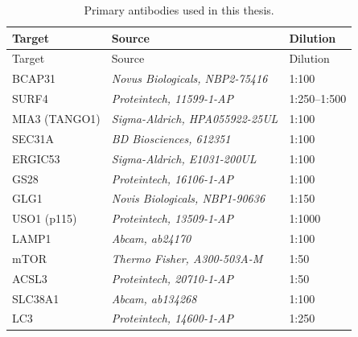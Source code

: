 \documentclass[
  12pt,
  a4paper,
]{book}
\begin{document}
\begin{longtable}[]{@{}lll@{}}
\caption{\label{tab:primary-table}Primary antibodies used in this thesis.}\tabularnewline
\toprule()
Target & Source & Dilution \\
\midrule()
\endfirsthead
\toprule()
Target & Source & Dilution \\
\midrule()
\endhead
BCAP31 & \emph{Novus Biologicals, NBP2-75416} & 1:100 \\
SURF4 & \emph{Proteintech, 11599-1-AP} & 1:250--1:500 \\
MIA3 (TANGO1) & \emph{Sigma-Aldrich, HPA055922-25UL} & 1:100 \\
SEC31A & \emph{BD Biosciences, 612351} & 1:100 \\
ERGIC53 & \emph{Sigma-Aldrich, E1031-200UL} & 1:100 \\
GS28 & \emph{Proteintech, 16106-1-AP} & 1:100 \\
GLG1 & \emph{Novis Biologicals, NBP1-90636} & 1:150 \\
USO1 (p115) & \emph{Proteintech, 13509-1-AP} & 1:1000 \\
LAMP1 & \emph{Abcam, ab24170} & 1:100 \\
mTOR & \emph{Thermo Fisher, A300-503A-M} & 1:50 \\
ACSL3 & \emph{Proteintech, 20710-1-AP} & 1:50 \\
SLC38A1 & \emph{Abcam, ab134268} & 1:100 \\
LC3 & \emph{Proteintech, 14600-1-AP} & 1:250 \\
\bottomrule()
\end{longtable}
\end{document}
